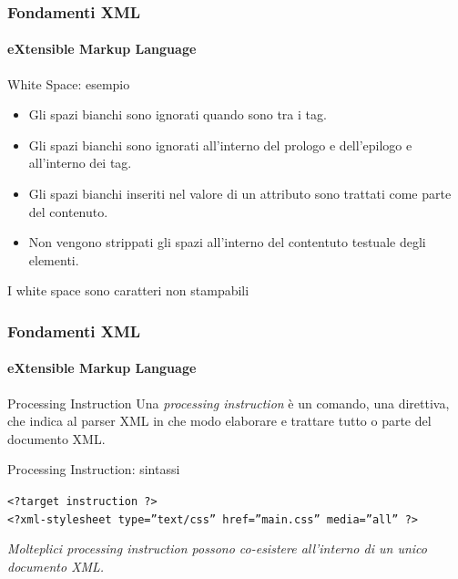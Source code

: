\begin{frame}
    \frametitle{Fondamenti XML}
    \framesubtitle{eXtensible Markup Language}
    \addtocounter{nframe}{1}

	\begin{block}{White Space: esempio}
		\begin{itemize}
			\item Gli spazi bianchi sono ignorati quando sono tra i tag.
			\item Gli spazi bianchi sono ignorati all'interno del prologo e dell'epilogo e all'interno dei tag. 
			\item Gli spazi bianchi inseriti nel valore di un attributo sono trattati come parte del contenuto.
			\item Non vengono strippati gli spazi all'interno del contentuto testuale degli elementi.
		\end{itemize}
	\end{block}

	\begin{tiny}
		I white space sono caratteri non stampabili
	\end{tiny}


\end{frame}


\begin{frame}
    \frametitle{Fondamenti XML}
    \framesubtitle{eXtensible Markup Language}
    \addtocounter{nframe}{1}

	\begin{block}{Processing Instruction}
		Una \textit{processing instruction} è un comando, una direttiva, che indica al parser XML in che modo elaborare e trattare tutto o parte del documento XML.
	\end{block}

	\begin{block}{Processing Instruction: sintassi}
		\begin{center}
			\texttt{<?target instruction ?>}
			\\\texttt{<?xml-stylesheet type=”text/css” href=”main.css” media=”all” ?>}
		\end{center}
	\end{block}
\begin{tiny}
    \textit{Molteplici processing instruction possono co-esistere all'interno di un unico documento XML.}
\end{tiny}
    

\end{frame}



